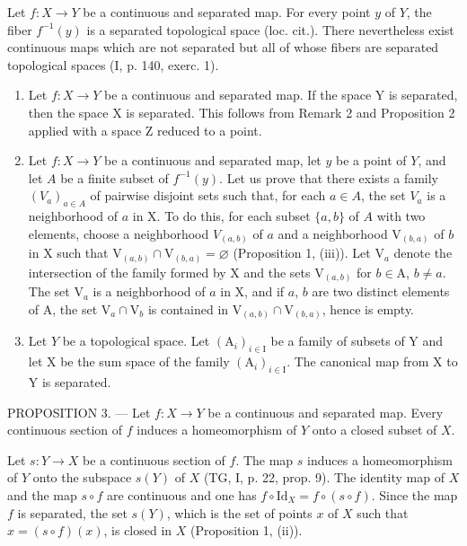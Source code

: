 Let \(f\colon X \to Y\) be a continuous and separated map. For every point \(y\) of \(Y\), the fiber \(f^{-1}(y)\) is a separated topological space (loc. cit.). There nevertheless exist continuous maps which are not separated but all of whose fibers are separated topological spaces (I, p. 140, exerc. 1).

\begin{enumerate}
\def\labelenumi{\arabic{enumi})}
\setcounter{enumi}{2}
\item
  Let \(f \colon X \to Y\) be a continuous and separated map. If the space Y is separated, then the space X is separated. This follows from Remark 2 and Proposition 2 applied with a space Z reduced to a point.
\item
  Let \(f \colon X \to Y\) be a continuous and separated map, let \(y\) be a point of \(Y\), and let \(A\) be a finite subset of \(f^{-1}(y)\). Let us prove that there exists a family \((V_a)_{a \in A}\) of pairwise disjoint sets such that, for each \(a \in A\), the set \(V_a\) is a neighborhood of \(a\) in X. To do this, for each subset \(\{a,b\}\) of \(A\) with two elements, choose a neighborhood \(V_{(a,b)}\) of \(a\) and a neighborhood \(\mathrm{V}_{(b,a)}\) of \(b\) in X such that \(\mathrm{V}_{(a,b)} \cap \mathrm{V}_{(b,a)} = \varnothing\) (Proposition 1, (iii)). Let \(\mathrm{V}_a\) denote the intersection of the family formed by X and the sets \(\mathrm{V}_{(a,b)}\) for \(b \in \mathrm{A}\), \(b \neq a\). The set \(\mathrm{V}_a\) is a neighborhood of \(a\) in X, and if \(a\), \(b\) are two distinct elements of A, the set \(\mathrm{V}_a \cap \mathrm{V}_b\) is contained in \(\mathrm{V}_{(a,b)} \cap \mathrm{V}_{(b,a)}\), hence is empty.
\item
  Let \(Y\) be a topological space. Let \((\mathrm{A}_{i})_{i\in\mathrm{I}}\) be a family of subsets of Y and let X be the sum space of the family \((\mathrm{A}_{i})_{i\in\mathrm{I}}\). The canonical map from X to Y is separated.
\end{enumerate}

PROPOSITION 3. --- Let \(f\colon X \to Y\) be a continuous and separated map. Every continuous section of \(f\) induces a homeomorphism of \(Y\) onto a closed subset of \(X\).

Let \(s\colon Y \to X\) be a continuous section of \(f\). The map \(s\) induces a homeomorphism of \(Y\) onto the subspace \(s(Y)\) of \(X\) (TG, I, p. 22, prop. 9). The identity map of \(X\) and the map \(s \circ f\) are continuous and one has \(f \circ \mathrm {Id}_{X} = f \circ (s \circ f)\). Since the map \(f\) is separated, the set \(s(Y)\), which is the set of points \(x\) of \(X\) such that \(x = (s \circ f)(x)\), is closed in \(X\) (Proposition 1, (ii)).

